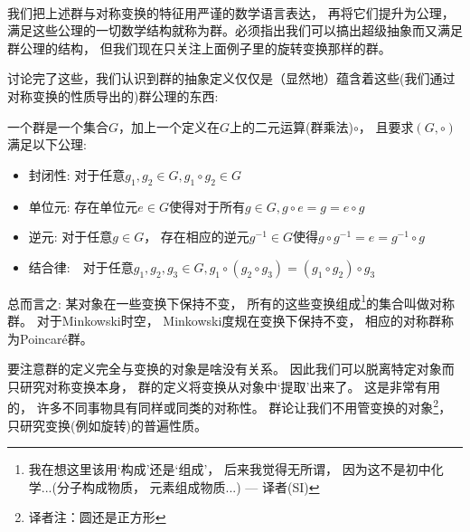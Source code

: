 \

我们把上述群与对称变换的特征用严谨的数学语言表达， 再将它们提升为公理， 满足这些公理的一切数学结构就称为群。必须指出我们可以搞出超级抽象而又满足群公理的结构， 但我们现在只关注上面例子里的旋转变换那样的群。

讨论完了这些，我们认识到群的抽象定义仅仅是（显然地）蕴含着这些(我们通过对称变换的性质导出的)群公理的东西:

一个群是一个集合$G$，加上一个定义在$G$上的二元运算(群乘法)$\circ$， 且要求$(G, \circ)$满足以下公理:
\begin{itemize}
	\item 封闭性: 对于任意$g_1, g_2 \in G, g_1 \circ g_2 \in G$

	\item 单位元: 存在单位元$e \in G$使得对于所有$g \in G, g\circ e = g = e \circ g$

	\item 逆元: 对于任意$g \in G$， 存在相应的逆元$g^{-1} \in G$使得$g \circ g^{-1} = e = g^{-1} \circ g$

	\item 结合律:　对于任意$g_1, g_2, g_3 \in G, g_1 \circ (g_2 \circ g_3) = (g_1 \circ g_2) \circ g_3$
\end{itemize}

总而言之: 某对象在一些变换下保持不变， 所有的这些变换组成\footnote{我在想这里该用`构成'还是`组成'， 后来我觉得无所谓， 因为这不是初中化学...(分子构成物质， 元素组成物质...) --- 译者(SI)}的集合叫做对称群。 对于Minkowski时空， Minkowski度规在变换下保持不变， 相应的对称群称为Poincar\'e群。

要注意群的定义完全与变换的对象是啥没有关系。 因此我们可以脱离特定对象而只研究对称变换本身， 群的定义将变换从对象中`提取'出来了。 这是非常有用的， 许多不同事物具有同样或同类的对称性。 群论让我们不用管变换的对象\footnote{译者注：圆还是正方形}， 只研究变换(例如旋转)的普遍性质。


